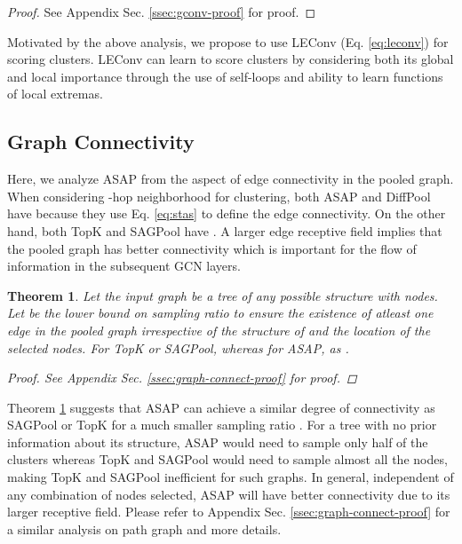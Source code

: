 \documentclass[letterpaper]{article} \usepackage{aaai20}  \usepackage{times}  \usepackage{helvet} \usepackage{courier}  \usepackage[hyphens]{url}  \usepackage{graphicx} \urlstyle{rm} \def\UrlFont{\rm}  \usepackage{graphicx}  \frenchspacing  \setlength{\pdfpagewidth}{8.5in}  \setlength{\pdfpageheight}{11in}
\newtheorem{theorem}{Theorem}
\begin{document}
\begin{proof}
See Appendix Sec. \ref{ssec:gconv-proof} for proof.
\end{proof}
\noindent Motivated by the above analysis, we propose to use LEConv (Eq. \ref{eq:leconv}) for scoring clusters. LEConv can learn to score clusters by considering both its global and local importance through the use of self-loops and ability to learn functions of local extremas.

\subsection{Graph Connectivity}
Here, we analyze ASAP from the aspect of edge connectivity in the pooled graph. When considering -hop neighborhood for clustering, both ASAP and DiffPool have  because they use Eq. \eqref{eq:stas} to define the edge connectivity. On the other hand, both TopK and SAGPool have . A larger edge receptive field implies that the pooled graph has better connectivity which is important for the flow of information in the subsequent GCN layers.



\begin{theorem}

\label{thm:star-graph}
	Let the input graph  be a tree of any possible structure with  nodes. Let  be the lower bound on sampling ratio  to ensure the existence of atleast one edge in the pooled graph irrespective of the structure of  and the location of the selected nodes. For TopK or SAGPool,  whereas for ASAP,  as .
\begin{proof}
See Appendix Sec. \ref{ssec:graph-connect-proof} for proof.
\end{proof}
\end{theorem}



\noindent Theorem \ref{thm:star-graph} suggests that ASAP can achieve a similar degree of connectivity as SAGPool or TopK for a much smaller sampling ratio . For a tree with no prior information about its structure, ASAP would need to sample only half of the clusters whereas TopK and SAGPool would need to sample almost all the nodes, making TopK and SAGPool inefficient for such graphs. In general, independent of any combination of nodes selected, ASAP will have better connectivity due to its larger receptive field. Please refer to Appendix Sec. \ref{ssec:graph-connect-proof} for a similar analysis on path graph and more details.
\end{document}
